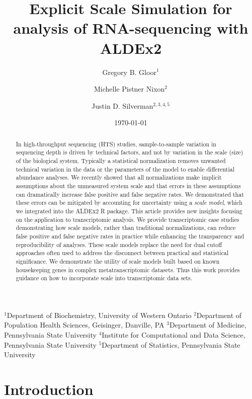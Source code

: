 \documentclass[
]{article}
\title{Explicit Scale Simulation for analysis of RNA-sequencing with
ALDEx2}
\author{Gregory B. Gloor$^1$ \and Michelle Pistner Nixon$^2$ \and Justin D. Silverman$^{2,3,4,5}$}
\date{\today}
\begin{document}
\maketitle

$^1$Department of Biochemistry, University of Western Ontario
$^2$Department of Population Health Sciences, Geisinger, Danville, PA
$^3$Department of Medicine, Pennsylvania State University
$^4$Institute for Computational and Data Science, Pennsylvania State University
$^5$Department of Statistics, Pennsylvania State University

\begin{abstract}
In high-throughput sequencing (HTS) studies, sample-to-sample variation
in sequencing depth is driven by technical factors, and not by variation
in the scale (size) of the biological system. Typically a statistical
normalization removes unwanted technical variation in the data or the
parameters of the model to enable differential abundance analyses. We
recently showed that all normalizations make implicit assumptions about
the unmeasured system scale and that errors in these assumptions can
dramatically increase false positive and false negative rates. We
demonstrated that these errors can be mitigated by accounting for
uncertainty using a \emph{scale model}, which we integrated into the
ALDEx2 R package. This article provides new insights focusing on the
application to transcriptomic analysis. We provide transcriptomic case
studies demonstrating how scale models, rather than traditional
normalizations, can reduce false positive and false negative rates in
practice while enhancing the transparency and reproducibility of
analyses. These scale models replace the need for dual cutoff approaches
often used to address the disconnect between practical and statistical
significance. We demonstrate the utility of scale models built based on
known housekeeping genes in complex metatranscriptomic datasets. Thus
this work provides guidance on how to incorporate scale into
transcriptomic data sets.
\end{abstract}

\section{Introduction}\label{introduction}

\doublespacing 
\singlespacing
\end{document}
